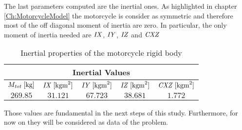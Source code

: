 The last parameters computed are the inertial ones. As highlighted in chapter \ref{Ch:MotorcycleModel} the motorcycle is consider as symmetric and therefore most of the off diagonal moment of inertia are zero. In particular, the only moment of inertia needed are ${\it IX}$, ${\it IY}$, ${\it IZ}$ and ${\it CXZ}$

%
\begin{table}[h!]
    \centering
    \begin{tabular}{@{}ccccc@{}}
    \toprule
    \multicolumn{5}{c}{\textbf{Inertial Values}} \\ \midrule
    $M_{{\it tot}} \; [\si{\kilogram}]$ & ${\it IX} \; [\si{\kilogram\metre^2}]$ & ${\it IY} \; [\si{\kilogram\metre^2}]$ & ${\it IZ} \; [\si{\kilogram\metre^2}]$ & ${\it CXZ} \; [\si{\kilogram\metre^2}]$\\
    $269.85$ & $31.121$ & $67.723$ & $38.681$ & $1.772$\\ \bottomrule
    \end{tabular}
    \caption{Inertial properties of the motorcycle rigid body}
    \label{tab:Inertia}
\end{table}
%

Those values are fundamental in the next steps of this study. Furthermore, for now on they will be considered as data of the problem. 
%